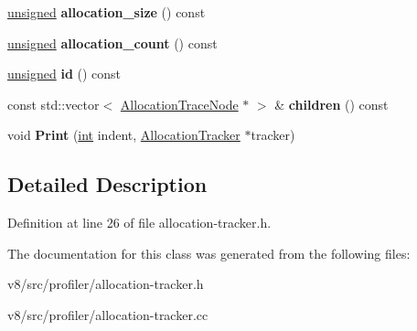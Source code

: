 \begin{DoxyCompactItemize}
\item 
\mbox{\label{classv8_1_1internal_1_1AllocationTraceNode_a9120f1f0161b27240167a9a3cef8314d}} 
\mbox{\hyperlink{classunsigned}{unsigned}} {\bfseries allocation\+\_\+size} () const
\item 
\mbox{\label{classv8_1_1internal_1_1AllocationTraceNode_a99d79d8ca6c91aaa4257b37b26446203}} 
\mbox{\hyperlink{classunsigned}{unsigned}} {\bfseries allocation\+\_\+count} () const
\item 
\mbox{\label{classv8_1_1internal_1_1AllocationTraceNode_a722786c8db6de58c024a7f258eea9e64}} 
\mbox{\hyperlink{classunsigned}{unsigned}} {\bfseries id} () const
\item 
\mbox{\label{classv8_1_1internal_1_1AllocationTraceNode_a31a1dc2ffbcc2913ad3aa5259d017ee7}} 
const std\+::vector$<$ \mbox{\hyperlink{classv8_1_1internal_1_1AllocationTraceNode}{Allocation\+Trace\+Node}} $\ast$ $>$ \& {\bfseries children} () const
\item 
\mbox{\label{classv8_1_1internal_1_1AllocationTraceNode_acfba1229f80910c5746758f8afdff7af}} 
void {\bfseries Print} (\mbox{\hyperlink{classint}{int}} indent, \mbox{\hyperlink{classv8_1_1internal_1_1AllocationTracker}{Allocation\+Tracker}} $\ast$tracker)
\end{DoxyCompactItemize}


\subsection{Detailed Description}


Definition at line 26 of file allocation-\/tracker.\+h.



The documentation for this class was generated from the following files\+:\begin{DoxyCompactItemize}
\item 
v8/src/profiler/allocation-\/tracker.\+h\item 
v8/src/profiler/allocation-\/tracker.\+cc\end{DoxyCompactItemize}
